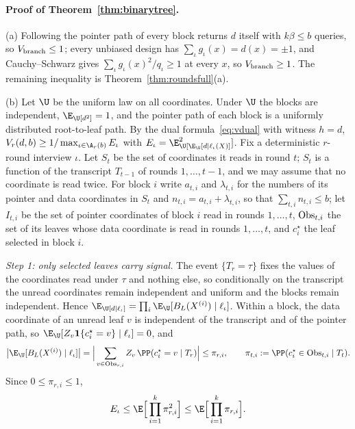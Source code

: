 \paragraph{Proof of Theorem~\ref{thm:binarytree}.}
(a) Following the pointer path of every block returns $d$ itself with
$k\beta\le b$ queries, so $V_{\rm branch}\le1$; every unbiased design has
$\sum_\iota g_\iota(x)=d(x)=\pm1$, and Cauchy--Schwarz gives
$\sum_\iota g_\iota(x)^2/q_\iota\ge1$ at every $x$, so $V_{\rm branch}\ge1$.
The remaining inequality is Theorem~\ref{thm:roundsfull}(a).

(b) Let $\U$ be the uniform law on all coordinates. Under $\U$ the blocks
are independent, $\E_\U[d^2]=1$, and the pointer path of each block is a
uniformly distributed root-to-leaf path. By the dual
formula~\eqref{eq:vdual} with witness $h=d$,
$V_r(d,b)\ge1/\max_{\iota\in\A_r(b)}E_\iota$ with
$E_\iota=\E_\U[\E_\U[d\mid\ell_\iota(X)]^2]$. Fix a deterministic $r$-round
interview $\iota$. Let $S_t$ be the set of coordinates it reads in round $t$;
$S_t$ is a function of the transcript $T_{t-1}$ of rounds $1,\ldots,t-1$, and
we may assume that no coordinate is read twice. For block $i$ write
$a_{t,i}$ and $\lambda_{t,i}$ for the numbers of its pointer and data
coordinates in $S_t$ and $n_{t,i}=a_{t,i}+\lambda_{t,i}$, so that
$\sum_{t,i}n_{t,i}\le b$; let $I_{t,i}$ be the set of pointer coordinates of
block $i$ read in rounds $1,\ldots,t$, ${\rm Obs}_{t,i}$ the set of its leaves
whose data coordinate is read in rounds $1,\ldots,t$, and $c^\star_i$ the leaf
selected in block $i$.

\emph{Step 1: only selected leaves carry signal.}
The event $\{T_r=\tau\}$ fixes the values of the coordinates read under
$\tau$ and nothing else, so conditionally on the transcript the unread
coordinates remain independent and uniform and the blocks remain
independent. Hence
$\E_\U[d\mid\ell_\iota]=\prod_i\E_\U[B_L(X^{(i)})\mid\ell_\iota]$. Within a
block, the data coordinate of an unread leaf $v$ is independent of the
transcript and of the pointer path, so
$\E_\U[Z_v\mathbf 1\{c^\star_i=v\}\mid\ell_\iota]=0$, and
\[
 \big|\E_\U[B_L(X^{(i)})\mid\ell_\iota]\big|
 =\Big|\sum_{v\in{\rm Obs}_{r,i}}Z_v\,\PP(c_i^\star=v\mid T_r)\Big|
 \le\pi_{r,i},\qquad \pi_{t,i}:=\PP(c_i^\star\in{\rm Obs}_{t,i}\mid T_t).
\]
Since $0\le\pi_{r,i}\le1$,
\begin{equation}
 E_\iota\le\E\Big[\prod_{i=1}^k\pi_{r,i}^2\Big]\le\E\Big[\prod_{i=1}^k\pi_{r,i}\Big].\label{eq:allhit}
\end{equation}

